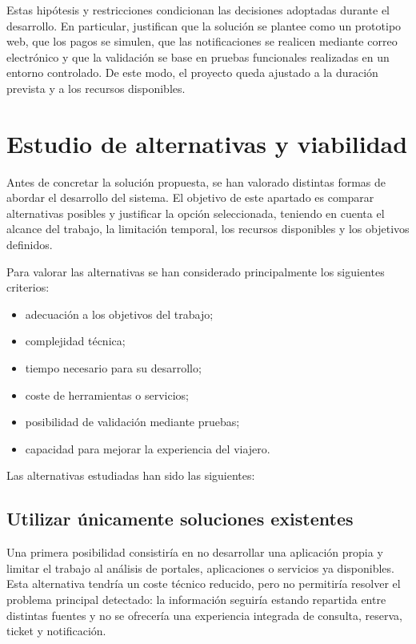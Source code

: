 Estas hipótesis y restricciones condicionan las decisiones adoptadas durante el desarrollo. En particular, justifican que la solución se plantee como un prototipo web, que los pagos se simulen, que las notificaciones se realicen mediante correo electrónico y que la validación se base en pruebas funcionales realizadas en un entorno controlado. De este modo, el proyecto queda ajustado a la duración prevista y a los recursos disponibles.


\section{Estudio de alternativas y viabilidad}
\label{sec:alternativas}

Antes de concretar la solución propuesta, se han valorado distintas formas de abordar el desarrollo del sistema. El objetivo de este apartado es comparar alternativas posibles y justificar la opción seleccionada, teniendo en cuenta el alcance del trabajo, la limitación temporal, los recursos disponibles y los objetivos definidos.

Para valorar las alternativas se han considerado principalmente los siguientes criterios:

\begin{itemize}
    \item adecuación a los objetivos del trabajo;
    \item complejidad técnica;
    \item tiempo necesario para su desarrollo;
    \item coste de herramientas o servicios;
    \item posibilidad de validación mediante pruebas;
    \item capacidad para mejorar la experiencia del viajero.
\end{itemize}

Las alternativas estudiadas han sido las siguientes:

\subsection{Utilizar únicamente soluciones existentes}

Una primera posibilidad consistiría en no desarrollar una aplicación propia y limitar el trabajo al análisis de portales, aplicaciones o servicios ya disponibles. Esta alternativa tendría un coste técnico reducido, pero no permitiría resolver el problema principal detectado: la información seguiría estando repartida entre distintas fuentes y no se ofrecería una experiencia integrada de consulta, reserva, ticket y notificación.

